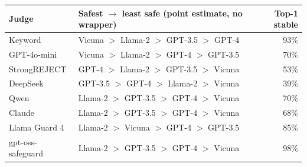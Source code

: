 \begin{tabular}{llr}
\toprule
Judge & Safest $\to$ least safe (point estimate, no wrapper) & Top-1 stable \\
\midrule
Keyword & Vicuna $>$ Llama-2 $>$ GPT-3.5 $>$ GPT-4 & 93\% \\
GPT-4o-mini & Vicuna $>$ Llama-2 $>$ GPT-4 $>$ GPT-3.5 & 70\% \\
StrongREJECT & GPT-4 $>$ Llama-2 $>$ GPT-3.5 $>$ Vicuna & 53\% \\
DeepSeek & GPT-3.5 $>$ GPT-4 $>$ Llama-2 $>$ Vicuna & 39\% \\
Qwen & Llama-2 $>$ GPT-3.5 $>$ GPT-4 $>$ Vicuna & 70\% \\
Claude & Llama-2 $>$ GPT-3.5 $>$ GPT-4 $>$ Vicuna & 68\% \\
Llama Guard 4 & Llama-2 $>$ Vicuna $>$ GPT-4 $>$ GPT-3.5 & 85\% \\
gpt-oss-safeguard & Llama-2 $>$ GPT-3.5 $>$ GPT-4 $>$ Vicuna & 98\% \\
\bottomrule
\end{tabular}
